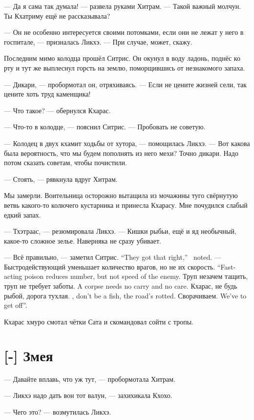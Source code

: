 --- Да я сама так думала! --- развела руками Хитрам.
--- Такой важный молчун.
Ты Кхатриму ещё не рассказывала?

--- Он не особенно интересуется своими потомками, если они не лежат у него в госпитале, --- призналась Ликхэ.
--- При случае, может, скажу.

Последним мимо колодца прошёл Ситрис.
Он окунул в воду ладонь, поднёс ко рту и тут же выплеснул горсть на землю, поморщившись от незнакомого запаха.

--- Дикари, --- пробормотал он, отряхиваясь.
--- Если не цените жизней сели, так цените хоть труд каменщика!

--- Что такое? --- обернулся Кхарас.

--- Что-то в колодце, --- пояснил Ситрис.
--- Пробовать не советую.

--- Колодец в двух кхамит ходьбы от хутора, --- помощилась Ликхэ.
--- Вот какова была вероятность, что мы будем пополнять из него мехи?
Точно дикари.
Надо потом сказать советам, чтобы почистили.

--- Стоять, --- рявкнула вдруг Хитрам.

Мы замерли.
Воительница осторожно вытащила из мочажины туго свёрнутую ветвь какого-то колючего кустарника и принесла Кхарасу.
Мне почудился слабый едкий запах.

--- Тхэтраас, --- резюмировала Ликхэ.
--- Кишки рыбьи, ещё и яд необычный, какое-то сложное зелье.
Наверняка не сразу убивает.

{--- Всё правильно, --- заметил Ситрис.}
{``They got that right,'' \Sitris\ noted.}
{--- Быстродействующий уменьшает количество врагов, но не их скорость.}
{``Fast-acting poison reduces number, but not speed of the enemy.}
{Труп незачем тащить, труп не требует заботы.}
{A corpse needs no carry and no care.}
{Кхарас, не будь рыбой, дорога тухлая.}
{\Kcharas, don't be a fish, the road's rotted.}
{Сворачиваем.}
{We've to get off''.}

Кхарас хмуро смотал чётки Сата и скомандовал сойти с тропы.

\section{[-] Змея}

--- Давайте вплавь, что уж тут, --- пробормотала Хитрам.

--- Ликхэ надо дать вон тот валун, --- захихикала Кхохо.

--- Чего это? --- возмутилась Ликхэ.

